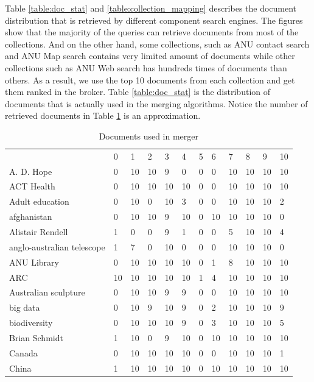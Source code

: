 Table \ref{table:doc_stat} and \ref{table:collection_mapping} describes the document distribution that is retrieved by different component search engines. The figures show that the majority of the queries can retrieve documents from most of the collections. And on the other hand, some collections, such as ANU contact search and ANU Map search contains very limited amount of documents while other collections such as ANU Web search has hundreds times of documents than others. As a result, we use the top 10 documents from each collection and get them ranked in the broker. Table \ref{table:doc_stat} is the distribution of documents that is actually used in the merging algorithms. Notice the number of retrieved documents in Table \ref{table:doc_stat2} is an approximation.
\begin{table}
\caption{Documents used in merger}
\label{table:doc_stat2}
\begin{tabular*}{0.5\textwidth}{|p{5cm}|l|l|l|l|l|l|l|l|l|l|l|}
\cline{1-12}
 	& 0 & 1 & 2 & 3 & 4 & 5 & 6 & 7 & 8 & 9 & 10 \\\cline{1-12}
A. D. Hope &0 &10 &10 &9 &0 &0 &0 &10 &10 &10 &10\\
\cline{1-12}
ACT Health &0 &10 &10 &10 &10 &0 &0 &10 &10 &10 &10\\
\cline{1-12}
Adult education &0 &10 &0 &10 &3 &0 &0 &10 &10 &10 &2\\
\cline{1-12}
afghanistan &0 &10 &10 &9 &10 &0 &10 &10 &10 &10 &0\\
\cline{1-12}
Alistair Rendell &1 &0 &0 &9 &1 &0 &0 &5 &10 &10 &4\\
\cline{1-12}
anglo-australian telescope &1 &7 &0 &10 &0 &0 &0 &10 &10 &10 &0\\
\cline{1-12}
ANU Library &0 &10 &10 &10 &10 &0 &1 &8 &10 &10 &10\\
\cline{1-12}
ARC &10 &10 &10 &10 &10 &1 &4 &10 &10 &10 &10\\
\cline{1-12}
Australian sculpture &0 &10 &10 &9 &9 &0 &0 &10 &10 &10 &10\\
\cline{1-12}
big data &0 &10 &9 &10 &9 &0 &2 &10 &10 &10 &9\\
\cline{1-12}
biodiversity &0 &10 &10 &10 &9 &0 &3 &10 &10 &10 &5\\
\cline{1-12}
Brian Schmidt &1 &10 &0 &9 &10 &0 &10 &10 &10 &10 &10\\
\cline{1-12}
Canada &0 &10 &10 &10 &10 &0 &0 &10 &10 &10 &1\\
\cline{1-12}
China &1 &10 &10 &10 &10 &0 &10 &10 &10 &10 &10\\
\cline{1-12}

\end{tabular*}
\end{table}
